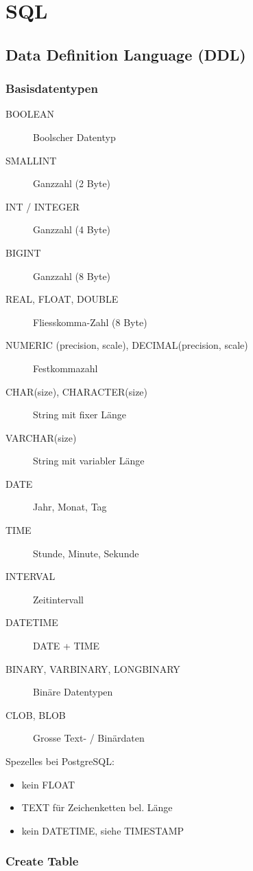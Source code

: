 \section{SQL}
    \subsection{Data Definition Language (DDL)}
    \subsubsection{Basisdatentypen}
        \begin{description}
            \item[BOOLEAN] Boolscher Datentyp
            \item[SMALLINT] Ganzzahl (2 Byte)
            \item[INT / INTEGER] Ganzzahl (4 Byte)
            \item[BIGINT] Ganzzahl (8 Byte)
            \item[REAL, FLOAT, DOUBLE] Fliesskomma-Zahl (8 Byte)
            \item[NUMERIC (precision, scale), DECIMAL(precision, scale)] Festkommazahl
            \item[CHAR(size), CHARACTER(size)] String mit fixer Länge
            \item[VARCHAR(size)] String mit variabler Länge
            \item[DATE] Jahr, Monat, Tag
            \item[TIME] Stunde, Minute, Sekunde
            \item[INTERVAL] Zeitintervall
            \item[DATETIME] DATE + TIME
            \item[BINARY, VARBINARY, LONGBINARY] Binäre Datentypen
            \item[CLOB, BLOB] Grosse Text- / Binärdaten
        \end{description}
        Spezelles bei PostgreSQL:
        \begin{itemize}
          \item kein FLOAT
          \item TEXT für Zeichenketten bel. Länge
          \item kein DATETIME, siehe TIMESTAMP
        \end{itemize}
        \subsubsection{Create Table}
            
